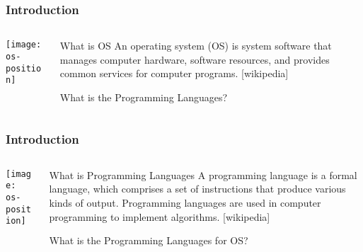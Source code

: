 \begin{frame}[plain]
	\frametitle{Introduction}
	
	
	
	\begin{columns}
		
		\begin{column}{.4\textwidth}
			
			\texttt{[image: os-position]}
			
		\end{column}
		
		\begin{column}{.6\textwidth}
			
	\begin{block}{What is OS}
	An operating system (OS) is system software that manages computer hardware, software resources, and provides common services for computer programs. [wikipedia]
    \end{block} 
	\LARGE
	What is the Programming Languages?

		\end{column}
		
		
	\end{columns}
	
	
\end{frame}


\begin{frame}[plain]
	\frametitle{Introduction}
	
	
	
	\begin{columns}
		
		\begin{column}{.4\textwidth}
			
			\texttt{[image: os-position]}
			
		\end{column}
		
		\begin{column}{.6\textwidth}
			
			\begin{block}{What is Programming Languages}
				A programming language is a formal language, which comprises a set of instructions that produce various kinds of output. Programming languages are used in computer programming to implement algorithms. [wikipedia]
			\end{block} 
			\LARGE
			What is the Programming Languages for OS?
			
		\end{column}
		
		
	\end{columns}
	
	
\end{frame}


